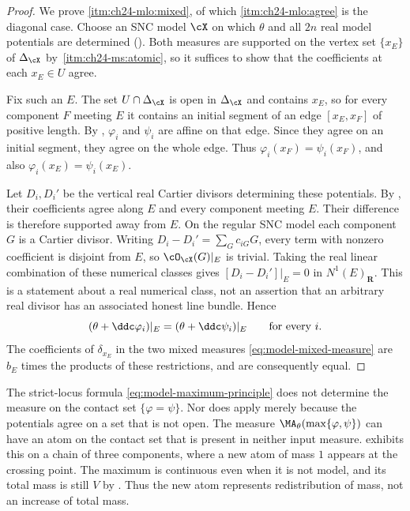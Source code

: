 \begin{proof}
We prove \cref{itm:ch24-mlo:mixed}, of which \cref{itm:ch24-mlo:agree} is the
diagonal case.  Choose an SNC model \(\cX\) on which \(\theta\) and all
\(2n\) real model potentials are determined ().
Both measures are supported on the vertex set \(\{x_E\}\) of
\(\Delta_{\cX}\) by
\,\cref{itm:ch24-ms:atomic}, so it suffices
to show that the coefficients at each \(x_E\in U\) agree.

Fix such an \(E\).  The set \(U\cap\Delta_{\cX}\) is open in
\(\Delta_{\cX}\) and contains \(x_E\), so for every component \(F\)
meeting \(E\) it contains an initial segment of an edge
\([x_E,x_F]\) of positive length.  By
, \(\varphi_i\) and \(\psi_i\) are
affine on that edge.  Since they agree on an initial segment, they agree
on the whole edge.  Thus \(\varphi_i(x_F)=\psi_i(x_F)\), and also
\(\varphi_i(x_E)=\psi_i(x_E)\).

Let \(D_i,D_i'\) be the vertical real Cartier divisors determining these
potentials.  By , their
coefficients agree along \(E\) and every component meeting \(E\).
Their difference is therefore supported away from \(E\).  On the
regular SNC model each component \(G\) is a Cartier divisor.  Writing
\(D_i-D_i'=\sum_G c_{iG}G\), every term with nonzero coefficient is
disjoint from \(E\), so \(\cO_{\cX}(G)|_E\) is trivial.  Taking the
real linear combination of these numerical classes gives
\([D_i-D_i']|_E=0\) in \(N^1(E)_{\mathbf R}\).  This is a statement
about a real numerical class, not an assertion that an arbitrary real
divisor has an associated honest line bundle.  Hence
\[
 (\theta+\ddc\varphi_i)|_E=(\theta+\ddc\psi_i)|_E
 \qquad\text{for every }i.
\]
The coefficients of \(\delta_{x_E}\) in the two mixed measures
\eqref{eq:model-mixed-measure} are \(b_E\) times the products of these
restrictions, and are consequently equal.
\end{proof}

\begin{remark}
\label{rem:ch24-contact-mass}
The strict-locus formula \eqref{eq:model-maximum-principle} does not
determine the measure on the contact set \(\{\varphi=\psi\}\).
Nor does  apply merely because the
potentials agree on a set that is not open.  The measure
\(\MA_\theta(\max\{\varphi,\psi\})\) can have an atom on the contact set
that is present in neither input measure.
 exhibits this on a chain of three
components, where a new atom of mass \(1\) appears at the crossing point.
The maximum is continuous even when it is not model, and its total
mass is still \(V\) by .
Thus the new atom represents redistribution of mass, not an increase
of total mass.
\end{remark}

